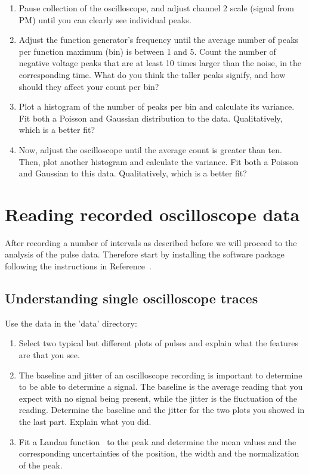 \documentclass[10pt,aps,twocolumn,secnumarabic,balancelastpage,amsmath,amssymb,nofootinbib,floatfix]{revtex4}
\begin{document}
\begin{enumerate}

\item Pause collection of the oscilloscope, and adjust channel 2 scale (signal from PM) until you can clearly see individual peaks. 

\item Adjust the function generator's frequency until the average number of peaks per function maximum (bin) is between 1 and 5. Count the number of negative voltage peaks that are at least 10 times larger than the noise, in the corresponding time. What do you think the taller peaks signify, and how should they affect your count per bin?

\item Plot a histogram of the number of peaks per bin and calculate its variance. Fit both a Poisson and Gaussian distribution to the data. Qualitatively, which is a better fit?

\item Now, adjust the oscilloscope until the average count is greater than ten. Then, plot another histogram and calculate the variance. Fit both a Poisson and Gaussian to this data. Qualitatively, which is a better fit?

\end{enumerate}

\section{Reading recorded oscilloscope data}

After recording a number of intervals as described before we will proceed to the analysis of the pulse data. Therefore start by installing the software package following the instructions in Reference~\cite{cite:pulses}.


\subsection{Understanding single oscilloscope traces}
Use the data in the 'data' directory:
\begin{enumerate}
\item Select two typical but different plots of pulses and explain what the features are that you see.
\item The baseline and jitter of an oscilloscope recording is important to determine to be able to determine a signal. The baseline is the average reading that you expect with no signal being present, while the jitter is the fluctuation of the reading. Determine the baseline and the jitter for the two plots you showed in the last part. Explain what you did.
\item Fit a Landau function~\cite{cite:plandau} to the peak and determine the mean values and the corresponding uncertainties of the position, the width and the normalization of the peak.
\end{enumerate}
\end{document}
